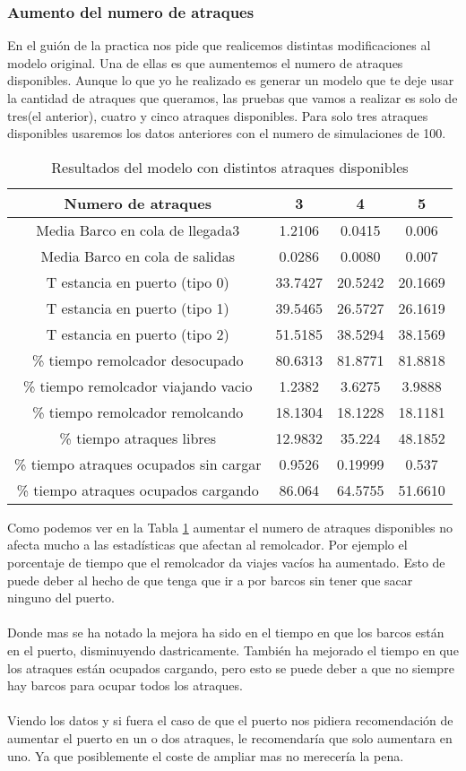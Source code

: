 \documentclass[12pt,a4paper]{article}
\begin{document}
\subsubsection{Aumento del numero de atraques}
En el guión de la practica nos pide que realicemos distintas modificaciones al modelo original. Una de ellas es que aumentemos el numero de atraques disponibles. Aunque lo que yo he realizado es generar un modelo que te deje usar la cantidad de atraques que queramos, las pruebas que vamos a realizar es solo de tres(el anterior), cuatro y cinco atraques disponibles. Para solo tres atraques disponibles usaremos los datos anteriores con el numero de simulaciones de 100.
\begin{table}[h]
	\centering
	\begin{tabular}{c|ccc}\toprule
		Numero de atraques&3&4&5\\\midrule
		Media Barco en cola de llegada3&1.2106&0.0415&0.006\\
		Media Barco en cola de salidas&0.0286&0.0080&0.007\\
		T estancia en puerto (tipo 0)&33.7427&20.5242&20.1669\\
		T estancia en puerto (tipo 1)&39.5465&26.5727&26.1619\\
		T estancia en puerto (tipo 2)&51.5185&38.5294&38.1569\\
		\% tiempo remolcador desocupado&80.6313&81.8771&81.8818\\
		\% tiempo remolcador viajando vacio&1.2382&3.6275&3.9888\\
		\% tiempo remolcador remolcando&18.1304&18.1228&18.1181\\
		\% tiempo atraques libres&12.9832&35.224&48.1852\\
		\% tiempo atraques ocupados sin cargar&0.9526&0.19999&0.537\\
		\% tiempo atraques ocupados cargando&86.064&64.5755&51.6610\\
	\end{tabular}
	\caption{Resultados del modelo con distintos atraques disponibles} \label{tab:petrolero_2}
\end{table}
Como podemos ver en la Tabla \ref{tab:petrolero_2} aumentar el numero de atraques disponibles no afecta mucho  a las estadísticas que afectan al remolcador. Por ejemplo el porcentaje de tiempo que el remolcador da viajes vacíos ha aumentado. Esto de puede deber al hecho de que tenga que ir a por barcos sin tener que sacar ninguno del puerto.\\\\
Donde mas se ha notado la mejora ha sido en el tiempo en que los barcos están en el puerto, disminuyendo dastricamente. También ha mejorado el tiempo en que los atraques están ocupados cargando, pero esto se puede deber a que no siempre hay barcos para ocupar todos los atraques.\\\\
Viendo los datos y si fuera el caso de que el puerto nos pidiera recomendación de aumentar el puerto en un o dos atraques, le recomendaría que solo aumentara en uno. Ya que posiblemente el coste de ampliar mas no merecería la pena.
\end{document}
